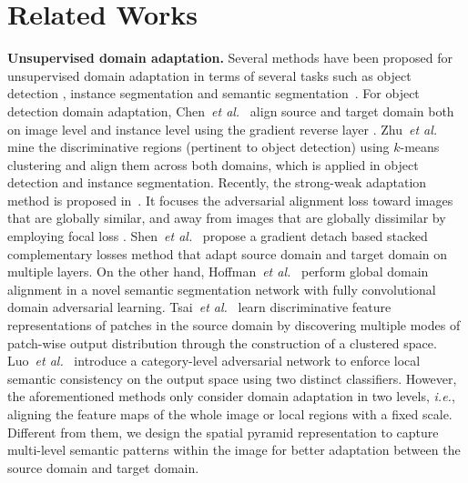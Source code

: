 \documentclass[runningheads]{llncs}
\def\ie{{\em i.e.}}
\def\etal{{\em et al.}}
\begin{document}
\section{Related Works}
{\noindent \textbf{Unsupervised domain adaptation.}} Several methods have been proposed for unsupervised domain adaptation in terms of several tasks such as object detection \cite{DBLP:conf/cvpr/Chen0SDG18,DBLP:conf/cvpr/SaitoUHS19,DBLP:journals/corr/abs-1911-02559}, instance segmentation \cite{DBLP:conf/cvpr/ZhuPYSL19} and semantic segmentation~\cite{DBLP:journals/corr/HoffmanWYD16,DBLP:journals/corr/abs-1901-05427,DBLP:conf/cvpr/Luo0GYY19}. For object detection domain adaptation, Chen~\etal~ \cite{DBLP:conf/cvpr/Chen0SDG18} align source and target domain both on image level and instance level using the gradient reverse layer \cite{DBLP:conf/icml/GaninL15}. Zhu~\etal~\cite{DBLP:conf/cvpr/ZhuPYSL19} mine the discriminative regions (pertinent to object detection) using $k$-means clustering and align them across both domains, which is applied in object detection and instance segmentation. Recently, the strong-weak adaptation method is proposed in~\cite{DBLP:conf/cvpr/SaitoUHS19}. It focuses the adversarial alignment loss toward images that are globally similar, and away from images that are globally dissimilar by employing focal loss \cite{DBLP:conf/iccv/LinGGHD17}. Shen~\etal~\cite{DBLP:journals/corr/abs-1911-02559} propose a gradient detach based stacked complementary losses method that adapt source domain and target domain on multiple layers. On the other hand, Hoffman~\etal~\cite{DBLP:journals/corr/HoffmanWYD16} perform global domain alignment in a novel semantic segmentation network with fully convolutional domain adversarial learning. Tsai~\etal~\cite{DBLP:journals/corr/abs-1901-05427} learn discriminative feature representations of patches in the source domain by discovering multiple modes of patch-wise output distribution through the construction of a clustered space. Luo~\etal~\cite{DBLP:conf/cvpr/Luo0GYY19} introduce a category-level adversarial network to enforce local semantic consistency on the output space using two distinct classifiers. However, the aforementioned methods only consider domain adaptation in two levels, \ie, aligning the feature maps of the whole image or local regions with a fixed scale. Different from them, we design the spatial pyramid representation to capture multi-level semantic patterns within the image for better adaptation between the source domain and target domain.
\end{document}

